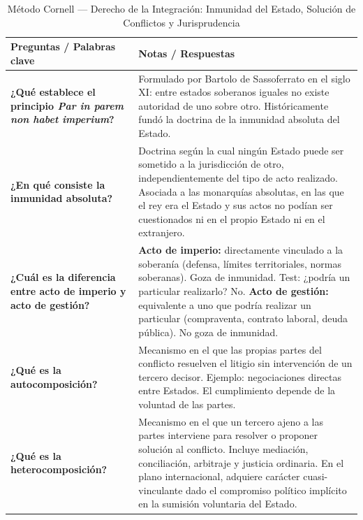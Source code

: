 \documentclass[12pt,oneside]{book}
\begin{document}
\begin{table}[H]
\centering
\caption{Método Cornell --- Derecho de la Integración: Inmunidad del Estado, Solución de Conflictos y Jurisprudencia}
\begin{tabularx}{\textwidth}{
    >{\raggedright\arraybackslash}p{}
    >{\raggedright\arraybackslash}X
}
\toprule
\textbf{Preguntas / Palabras clave} &
\textbf{Notas / Respuestas} \\
\midrule

\textbf{¿Qué establece el principio \textit{Par in parem non habet imperium}?} &
Formulado por Bartolo de Sassoferrato en el siglo XI: entre estados soberanos iguales no existe autoridad de uno sobre otro. Históricamente fundó la doctrina de la inmunidad absoluta del Estado. \\

\addlinespace

\textbf{¿En qué consiste la inmunidad absoluta?} &
Doctrina según la cual ningún Estado puede ser sometido a la jurisdicción de otro, independientemente del tipo de acto realizado. Asociada a las monarquías absolutas, en las que el rey era el Estado y sus actos no podían ser cuestionados ni en el propio Estado ni en el extranjero. \\

\addlinespace

\textbf{¿Cuál es la diferencia entre acto de imperio y acto de gestión?} &
\textbf{Acto de imperio:} directamente vinculado a la soberanía (defensa, límites territoriales, normas soberanas). Goza de inmunidad. Test: ¿podría un particular realizarlo? No. \textbf{Acto de gestión:} equivalente a uno que podría realizar un particular (compraventa, contrato laboral, deuda pública). No goza de inmunidad. \\

\addlinespace

\textbf{¿Qué es la autocomposición?} &
Mecanismo en el que las propias partes del conflicto resuelven el litigio sin intervención de un tercero decisor. Ejemplo: negociaciones directas entre Estados. El cumplimiento depende de la voluntad de las partes. \\

\addlinespace

\textbf{¿Qué es la heterocomposición?} &
Mecanismo en el que un tercero ajeno a las partes interviene para resolver o proponer solución al conflicto. Incluye mediación, conciliación, arbitraje y justicia ordinaria. En el plano internacional, adquiere carácter cuasi-vinculante dado el compromiso político implícito en la sumisión voluntaria del Estado. \\


\end{tabularx}
\end{table}
\end{document}
